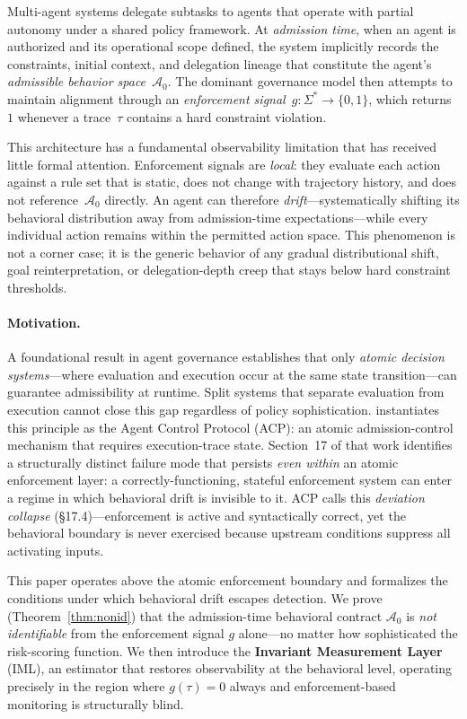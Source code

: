 \documentclass[11pt]{article}
\newcommand{\Sigstar}{\Sigma^{*}}
\newcommand{\Azero}{\mathcal{A}_0}
\begin{document}
Multi-agent systems delegate subtasks to agents that operate with partial
autonomy under a shared policy framework.  At \emph{admission time}, when an
agent is authorized and its operational scope defined, the system implicitly
records the constraints, initial context, and delegation lineage that
constitute the agent's \emph{admissible behavior space}~$\Azero$.  The
dominant governance model then attempts to maintain alignment through an
\emph{enforcement signal}~$g : \Sigstar \to \{0,1\}$, which returns~$1$
whenever a trace~$\tau$ contains a hard constraint violation.

This architecture has a fundamental observability limitation that has received
little formal attention.  Enforcement signals are \emph{local}: they evaluate
each action against a rule set that is static, does not change with trajectory
history, and does not reference~$\Azero$ directly.  An agent can therefore
\emph{drift}---systematically shifting its behavioral distribution away from
admission-time expectations---while every individual action remains within the
permitted action space.  This phenomenon is not a corner case; it is the
generic behavior of any gradual distributional shift, goal reinterpretation,
or delegation-depth creep that stays below hard constraint thresholds.

\paragraph{Motivation.}
A foundational result in agent governance \citep{fernandez2026a} establishes
that only \emph{atomic decision systems}---where evaluation and execution
occur at the same state transition---can guarantee admissibility at runtime.  Split systems that separate evaluation from
execution cannot close this gap regardless of policy sophistication.
\citet{fernandez2026acp} instantiates this principle as the Agent Control
Protocol (ACP): an atomic admission-control mechanism that requires
execution-trace state.  Section~17 of that work identifies a structurally
distinct failure mode that persists \emph{even within} an atomic enforcement
layer: a correctly-functioning, stateful enforcement system can enter a regime
in which behavioral drift is invisible to it.
ACP calls this \emph{deviation collapse} (\S17.4)---enforcement is active and
syntactically correct, yet the behavioral boundary is never exercised because
upstream conditions suppress all activating inputs.

This paper operates above the atomic enforcement boundary and formalizes
the conditions under which behavioral drift escapes detection.
We prove (Theorem~\ref{thm:nonid}) that the admission-time behavioral
contract $\Azero$ is \emph{not identifiable} from the enforcement signal
$g$ alone---no matter how sophisticated the risk-scoring function.
We then introduce the \textbf{Invariant Measurement Layer} (IML), an
estimator that restores observability at the behavioral level, operating
precisely in the region where $g(\tau) = 0$ always and enforcement-based
monitoring is structurally blind.
\end{document}

